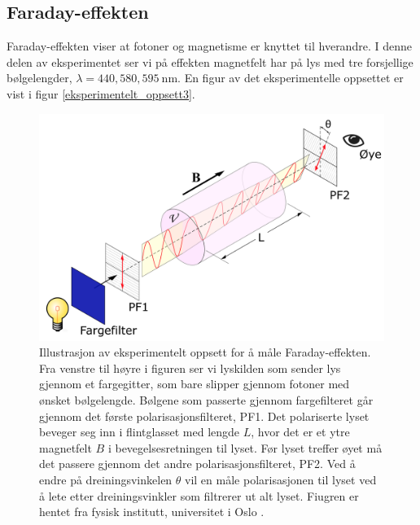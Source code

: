 \documentclass[%
 reprint,
 amsmath,amssymb,
 aps,
 norsk,
]{revtex4-1}
\begin{document}
\subsection{Faraday-effekten}
Faraday-effekten viser at fotoner og magnetisme er knyttet til hverandre. I denne delen av eksperimentet ser vi på effekten magnetfelt har på lys med tre forsjellige bølgelengder, $\lambda = 440, 580, \SI{595}{\nano\meter}$. En figur av det eksperimentelle oppsettet er vist i figur \vref{eksperimentelt_oppsett3}.
\begin{figure}[h!]
  \centering
  \includegraphics[scale=0.27]{oppsett3.png}
  \caption{Illustrasjon av eksperimentelt oppsett for å måle Faraday-effekten. Fra venstre til høyre i figuren ser vi lyskilden som sender lys gjennom et fargegitter, som bare slipper gjennom fotoner med ønsket bølgelengde. Bølgene som passerte gjennom fargefilteret går gjennom det første polarisasjonsfilteret, PF1. Det polariserte lyset beveger seg inn i flintglasset med lengde $L$, hvor det er et ytre magnetfelt $B$ i bevegelsesretningen til lyset. Før lyset treffer øyet må det passere gjennom det andre polarisasjonsfilteret, PF2. Ved å endre på dreiningsvinkelen $\theta$ vil en måle polarisasjonen til lyset ved å lete etter dreiningsvinkler som filtrerer ut alt lyset. Fiugren er hentet fra fysisk institutt, universitet i Oslo \cite{oppgave}.}
  \label{eksperimentelt_oppsett3}
\end{figure}
\end{document}
